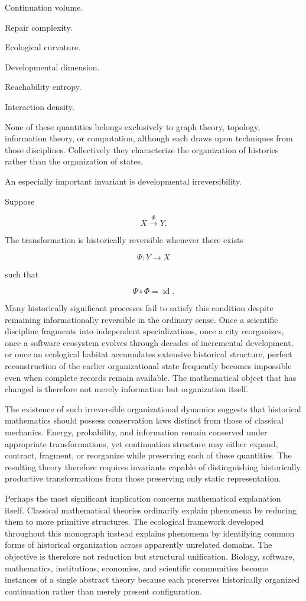 \documentclass[12pt,oneside]{article}
\theoremstyle{remark}
\begin{document}
Continuation volume.

Repair complexity.

Ecological curvature.

Developmental dimension.

Reachability entropy.

Interaction density.

None of these quantities belongs exclusively to graph theory, topology,
information theory, or computation, although each draws upon techniques from
those disciplines. Collectively they characterize the organization of histories
rather than the organization of states.

An especially important invariant is developmental irreversibility.

Suppose

\[
X
\xrightarrow{\Phi}
Y.
\]

The transformation is historically reversible whenever there exists

\[
\Psi
:
Y
\rightarrow
X
\]

such that

\[
\Psi
\circ
\Phi
=
\operatorname{id}.
\]

Many historically significant processes fail to satisfy this condition despite
remaining informationally reversible in the ordinary sense. Once a scientific
discipline fragments into independent specializations, once a city reorganizes,
once a software ecosystem evolves through decades of incremental development,
or once an ecological habitat accumulates extensive historical structure,
perfect reconstruction of the earlier organizational state frequently becomes
impossible even when complete records remain available. The mathematical object
that has changed is therefore not merely information but organization itself.

The existence of such irreversible organizational dynamics suggests that
historical mathematics should possess conservation laws distinct from those of
classical mechanics. Energy, probability, and information remain conserved under
appropriate transformations, yet continuation structure may either expand,
contract, fragment, or reorganize while preserving each of these quantities.
The resulting theory therefore requires invariants capable of distinguishing
historically productive transformations from those preserving only static
representation.

Perhaps the most significant implication concerns mathematical explanation
itself. Classical mathematical theories ordinarily explain phenomena by reducing
them to more primitive structures. The ecological framework developed
throughout this monograph instead explains phenomena by identifying common forms
of historical organization across apparently unrelated domains. The objective is
therefore not reduction but structural unification. Biology, software,
mathematics, institutions, economies, and scientific communities become
instances of a single abstract theory because each preserves historically
organized continuation rather than merely present configuration.
\end{document}
